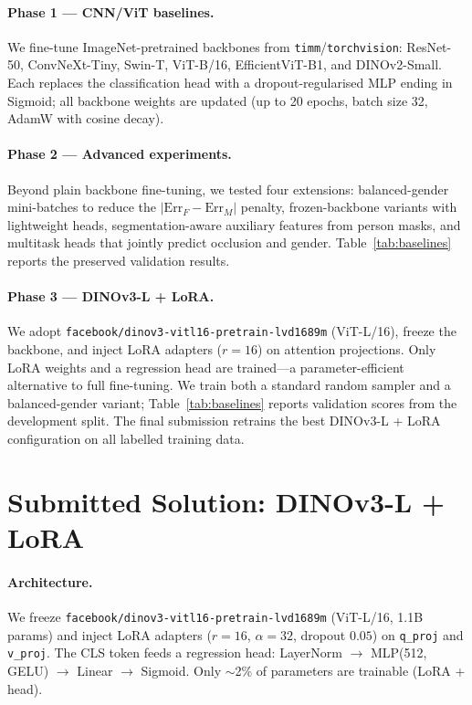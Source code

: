 \documentclass[10pt,a4paper]{article}
\begin{document}
\paragraph{Phase 1 --- CNN/ViT baselines.}
We fine-tune ImageNet-pretrained backbones from \texttt{timm}/\texttt{torchvision}: ResNet-50, ConvNeXt-Tiny, Swin-T, ViT-B/16, EfficientViT-B1, and DINOv2-Small.
Each replaces the classification head with a dropout-regularised MLP ending in Sigmoid; all backbone weights are updated (up to 20 epochs, batch size 32, AdamW with cosine decay).

\paragraph{Phase 2 --- Advanced experiments.}
Beyond plain backbone fine-tuning, we tested four extensions: balanced-gender mini-batches to reduce the $|{\mathrm{Err}_F - \mathrm{Err}_M}|$ penalty, frozen-backbone variants with lightweight heads, segmentation-aware auxiliary features from person masks, and multitask heads that jointly predict occlusion and gender.
Table~\ref{tab:baselines} reports the preserved validation results.

\paragraph{Phase 3 --- DINOv3-L + LoRA.}
We adopt \texttt{facebook/dinov3-vitl16-pretrain-lvd1689m} (ViT-L/16), freeze the backbone, and inject LoRA adapters ($r{=}16$) on attention projections.
Only LoRA weights and a regression head are trained---a parameter-efficient alternative to full fine-tuning.
We train both a standard random sampler and a balanced-gender variant; Table~\ref{tab:baselines} reports validation scores from the development split.
The final submission retrains the best DINOv3-L + LoRA configuration on all labelled training data.

\section*{Submitted Solution: DINOv3-L + LoRA}
\paragraph{Architecture.}
We freeze \texttt{facebook/dinov3-vitl16-pretrain-lvd1689m} (ViT-L/16, 1.1B params) and inject LoRA adapters ($r{=}16$, $\alpha{=}32$, dropout $0.05$) on \texttt{q\_proj} and \texttt{v\_proj}.
The CLS token feeds a regression head: LayerNorm $\rightarrow$ MLP(512, GELU) $\rightarrow$ Linear $\rightarrow$ Sigmoid.
Only $\sim$2\% of parameters are trainable (LoRA + head).
\end{document}
